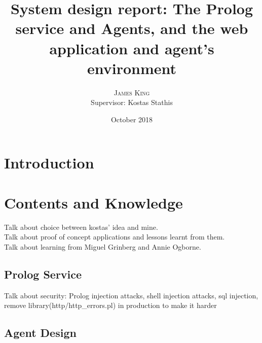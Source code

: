 \documentclass[twoside,twocolumn]{article}
\title{System design report: The Prolog service and Agents, and the web application and agent's environment} %
\author{%
\textsc{James King} \\%
\normalsize Supervisor: Kostas Stathis \\ %
}
\date{October 2018} %
\begin{document}

\maketitle


\section{Introduction}



\section{Contents and Knowledge}
Talk about choice between kostas' idea and mine.\\
Talk about proof of concept applications and lessons learnt from them.\\
Talk about learning from Miguel Grinberg and Annie Ogborne.
\subsection{Prolog Service}
Talk about security: Prolog injection attacks, shell injection attacks, sql injection, remove library(http/http_errors.pl) in production to make it harder


\subsection{Agent Design}
\end{document}
